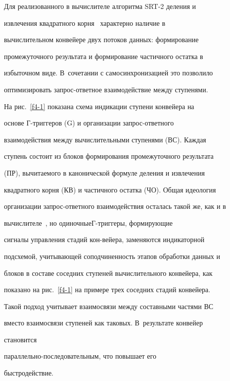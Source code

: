    Для реализованного в вычислителе алгоритма SRT-2 деления и


извлечения квадратного корня~\cite{2-1} характерно наличие в


вы\-чис\-ли\-тель\-ном конвейере двух потоков данных: формирование


промежуточного результата и формирование частичного остат\-ка в


избыточном виде. В~сочетании с самосинхронизацией это поз\-во\-ли\-ло


оптимизировать за\-прос-от\-вет\-ное взаимодействие  меж\-ду ступенями.





   На рис.~\ref{f4-1} показана схема индикации ступени конвейера на


основе Г-триг\-ге\-ров (G) и организации за\-прос-от\-вет\-но\-го


взаимодействия между вычислительными ступенями (ВС). Каждая


ступень состоит из блоков формирования промежуточного результата


(ПР), вычитаемого в канонической формуле деления и извлечения


квадратного корня (КВ) и частичного остатка (ЧО). Общая идеология


организации зап\-рос-от\-вет\-но\-го взаимодействия осталась такой же, как и в


вычислителе~\cite{9-1}, но одиночные\linebreak \mbox{Г-триг}\-ге\-ры, формирующие


сигналы управления стадий кон-\linebreak вейера, заменяются индикаторной


подсхемой, учитывающей соподчиненность этапов обработки данных и


блоков в составе соседних ступеней вычислительного конвейера, как


показано на рис.~\ref{f4-1} на примере трех соседних стадий конвейера.


Такой подход учитывает взаимосвязи между составными частями ВС


вмес\-то взаимосвязи ступеней как таковых. В~результате конвейер


становится


   па\-рал\-лель\-но-по\-сле\-до\-ва\-тель\-ным, что повышает его\linebreak


быст\-родействие.





